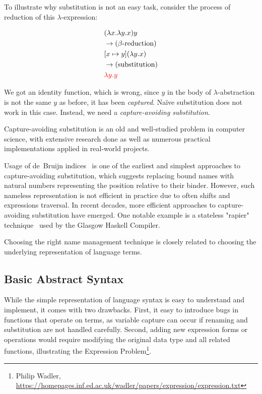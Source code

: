 To illustrate why substitution is not an easy task, consider the process of reduction of this $\lambda$-expression:

\vspace{-1cm}
\begin{align*}
  & (\lambda x. \lambda y. x) y \\
  & \rightarrow \text{($\beta$-reduction)} \\
  & [x \mapsto y](\lambda y. x) \\
  & \rightarrow \text{(substitution)} \\
  & \textcolor{red}{\lambda y. y}
\end{align*}

We got an identity function, which is wrong, since $y$ in the body of $\lambda$-abstraction is not the same $y$ as before, it has been \textit{captured}. Naïve substitution does not work in this case. Instead, we need a \textit{capture-avoiding substitution}.

Capture-avoiding substitution is an old and well-studied problem in computer science, with extensive research done as well as numerous practical implementations applied in real-world projects.

Usage of de~Bruijn indices~\cite{deBruijn1972} is one of the earliest and simplest approaches to capture-avoiding substitution, which suggests replacing bound names with natural numbers representing the position relative to their binder. However, such nameless representation is not efficient in practice due to often shifts and expressions traversal. In recent decades, more efficient approaches to capture-avoiding substitution have emerged. One notable example is a stateless "rapier" technique~\cite{Simon2002_SecretsGHC} used by the Glasgow Haskell Compiler.

Choosing the right name management technique is closely related to choosing the underlying representation of language terms.

\subsection{Basic Abstract Syntax}

While the simple representation of language syntax is easy to understand and implement, it comes with two drawbacks. First, it easy to introduce bugs in functions that operate on terms, as variable capture can occur if renaming and substitution are not handled carefully. Second, adding new expression forms or operations would require modifying the original data type and all related functions, illustrating the Expression Problem\footnote{Philip Wadler, \url{https://homepages.inf.ed.ac.uk/wadler/papers/expression/expression.txt}}.


